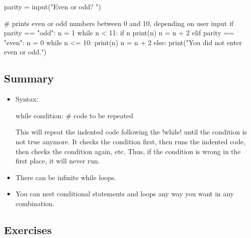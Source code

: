 \documentclass[11pt]{cselabheader}
\begin{document}
\begin{python3code}
parity = input("Even or odd? ")

# prints even or odd numbers between 0 and 10, depending on user input
if parity == "odd":
  n = 1
  while n < 11:
    if n %
      print(n)
    n = n + 2
elif parity == "even":
  n = 0
  while n <= 10:
    print(n)
    n = n + 2
else:
    print("You did not enter even or odd.")
\end{python3code}

\subsection{Summary}

\begin{itemize}
    \item Syntax:

      \begin{python3code}
while condition:
    # code to be repeated
      \end{python3code}

    This will repeat the indented code following the \pythoninline!while! until the
    condition is not true anymore. It checks the condition first, then runs the
    indented code, then checks the condition again, etc. Thus, if the condition
    is wrong in the first place, it will never run.

%
%

  \item There can be infinite while loops.
  \item You can nest conditional statements and loops any way you want in any
    combination.
\end{itemize}

\pagebreak
\subsection{Exercises}
\label{subsec:whileex}
\end{document}
